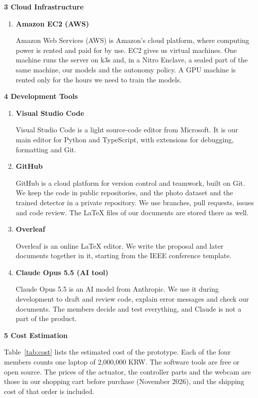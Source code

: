 \documentclass[conference]{IEEEtran}
\newcommand{\itemhead}[1]{\item \textbf{#1}\par\nobreak}
\begin{document}
\par\smallskip\noindent\textbf{3 Cloud Infrastructure}
\begin{enumerate}
\itemhead{Amazon EC2 (AWS)}
Amazon Web Services (AWS) is Amazon's cloud platform, where computing power is rented and paid for by use. EC2 gives us virtual machines. One machine runs the server on k3s and, in a Nitro Enclave, a sealed part of the same machine, our models and the autonomy policy. A GPU machine is rented only for the hours we need to train the models.

\end{enumerate}

\par\smallskip\noindent\textbf{4 Development Tools}
\begin{enumerate}
\itemhead{Visual Studio Code}
Visual Studio Code is a light source-code editor from Microsoft. It is our main editor for Python and TypeScript, with extensions for debugging, formatting and Git.

\itemhead{GitHub}
GitHub is a cloud platform for version control and teamwork, built on Git. We keep the code in public repositories, and the photo dataset and the trained detector in a private repository. We use branches, pull requests, issues and code review. The LaTeX files of our documents are stored there as well.

\itemhead{Overleaf}
Overleaf is an online LaTeX editor. We write the proposal and later documents together in it, starting from the IEEE conference template.

\itemhead{Claude Opus 5.5 (AI tool)}
Claude Opus 5.5 is an AI model from Anthropic. We use it during development to draft and review code, explain error messages and check our documents. The members decide and test everything, and Claude is not a part of the product.

\end{enumerate}

\par\smallskip\noindent\textbf{5 Cost Estimation}

Table~\ref{tab:cost} lists the estimated cost of the prototype. Each of the four members counts one laptop of 2,000,000 KRW. The software tools are free or open source. The prices of the actuator, the controller parts and the webcam are those in our shopping cart before purchase (November 2026), and the shipping cost of that order is included.
\end{document}
